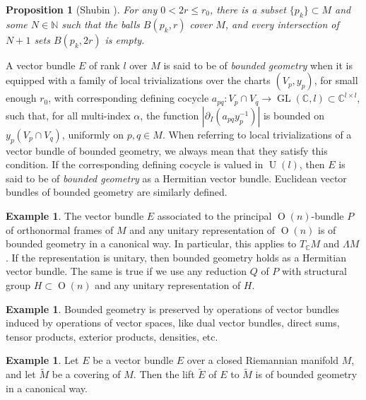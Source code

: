 \documentclass{memo-l}
\theoremstyle{plain}
\newtheorem{prop}[thm]{Proposition}
\theoremstyle{definition}
\newtheorem{ex}[thm]{Example}
\theoremstyle{remark}
\newcommand{\C}{\mathbb{C}}
\newcommand{\N}{\mathbb{N}}
\newcommand{\GL}{\operatorname{GL}}
\numberwithin{section}{chapter}
\numberwithin{equation}{section}%
\begin{document}
\begin{prop}[{Shubin \cite[Appendix~A1.1, Lemma~1.2]{Shubin1992}}]\label{p: p_k}
For any $0<2r\le r_0$, there is a subset $\{p_k\}\subset M$ and some $N\in\N$ such that the balls $B(p_k,r)$ cover $M$, and every intersection of $N+1$ sets $B(p_k,2r)$ is empty.
\end{prop}


A vector bundle $E$ of rank $l$ over $M$ is said to be of \emph{bounded geometry} when it is equipped with a family of local trivializations over the charts $(V_p,y_p)$, for small enough $r_0$, with corresponding defining cocycle $a_{pq}:V_p\cap V_q\to\GL(\C,l)\subset\C^{l\times l}$, such that, for all multi-index $\alpha$, the function $|\partial_I(a_{pq}y_p^{-1})|$ is bounded on $y_p(V_p\cap V_q)$, uniformly on $p,q\in M$. When referring to local trivializations of a vector bundle of bounded geometry, we always mean that they satisfy this condition. If the corresponding defining cocycle is valued in $\operatorname{U}(l)$, then $E$ is said to be of \emph{bounded geometry} as a Hermitian vector bundle. Euclidean vector bundles of bounded geometry are similarly defined.

\begin{ex}\label{ex: bundles of bd geom}
The vector bundle $E$ associated to the principal $\operatorname{O}(n)$-bundle $P$ of orthonormal frames of $M$ and any unitary representation of $\operatorname{O}(n)$ is of bounded geometry in a canonical way. In particular, this applies to $T_\C M$ and $\Lambda M$. If the representation is unitary, then bounded geometry holds as a Hermitian vector bundle. The same is true if we use any reduction $Q$ of $P$ with structural group $H\subset\operatorname{O}(n)$ and any unitary representation of $H$. 
\end{ex}

\begin{ex}\label{ex: operations of bundles of bd geom}
Bounded geometry is preserved by operations of vector bundles induced by operations of vector spaces, like dual vector bundles, direct sums, tensor products, exterior products, densities, etc.
\end{ex}

\begin{ex}\label{ex: widetilde E}
Let $E$ be a vector bundle $E$ over a closed Riemannian manifold $M$, and let $\widetilde M$ be a covering of $M$. Then the lift $\widetilde E$ of $E$ to $\widetilde M$ is of bounded geometry in a canonical way.
\end{ex}
\end{document}

